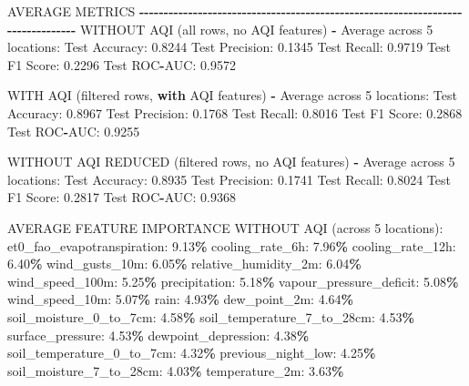 \documentclass[
  letterpaper,
  DIV=11,
  numbers=noendperiod]{scrartcl}
\newenvironment{Shaded}{\begin{snugshade}}{\end{snugshade}}
\newcommand{\BuiltInTok}[1]{#1}
\newcommand{\ControlFlowTok}[1]{\textcolor[rgb]{0.13,0.29,0.53}{\textbf{#1}}}
\newcommand{\DecValTok}[1]{\textcolor[rgb]{0.00,0.00,0.81}{#1}}
\newcommand{\FloatTok}[1]{\textcolor[rgb]{0.00,0.00,0.81}{#1}}
\newcommand{\NormalTok}[1]{#1}
\newcommand{\OperatorTok}[1]{\textcolor[rgb]{0.81,0.36,0.00}{\textbf{#1}}}
\begin{document}
\begin{Shaded}
\begin{Highlighting}[]
\NormalTok{AVERAGE METRICS}
\OperatorTok{{-}{-}{-}{-}{-}{-}{-}{-}{-}{-}{-}{-}{-}{-}{-}{-}{-}{-}{-}{-}{-}{-}{-}{-}{-}{-}{-}{-}{-}{-}{-}{-}{-}{-}{-}{-}{-}{-}{-}{-}{-}{-}{-}{-}{-}{-}{-}{-}{-}{-}{-}{-}{-}{-}{-}{-}{-}{-}{-}{-}{-}{-}{-}{-}{-}{-}{-}{-}{-}{-}{-}{-}{-}{-}{-}{-}{-}{-}{-}{-}}
\NormalTok{WITHOUT AQI (}\BuiltInTok{all}\NormalTok{ rows, no AQI features) }\OperatorTok{{-}}\NormalTok{ Average across }\DecValTok{5}\NormalTok{ locations:}
\NormalTok{  Test Accuracy: }\FloatTok{0.8244}
\NormalTok{  Test Precision: }\FloatTok{0.1345}
\NormalTok{  Test Recall: }\FloatTok{0.9719}
\NormalTok{  Test F1 Score: }\FloatTok{0.2296}
\NormalTok{  Test ROC}\OperatorTok{{-}}\NormalTok{AUC: }\FloatTok{0.9572}

\NormalTok{WITH AQI (filtered rows, }\ControlFlowTok{with}\NormalTok{ AQI features) }\OperatorTok{{-}}\NormalTok{ Average across }\DecValTok{5}\NormalTok{ locations:}
\NormalTok{  Test Accuracy: }\FloatTok{0.8967}
\NormalTok{  Test Precision: }\FloatTok{0.1768}
\NormalTok{  Test Recall: }\FloatTok{0.8016}
\NormalTok{  Test F1 Score: }\FloatTok{0.2868}
\NormalTok{  Test ROC}\OperatorTok{{-}}\NormalTok{AUC: }\FloatTok{0.9255}

\NormalTok{WITHOUT AQI REDUCED (filtered rows, no AQI features) }\OperatorTok{{-}}\NormalTok{ Average across }\DecValTok{5}\NormalTok{ locations:}
\NormalTok{  Test Accuracy: }\FloatTok{0.8935}
\NormalTok{  Test Precision: }\FloatTok{0.1741}
\NormalTok{  Test Recall: }\FloatTok{0.8024}
\NormalTok{  Test F1 Score: }\FloatTok{0.2817}
\NormalTok{  Test ROC}\OperatorTok{{-}}\NormalTok{AUC: }\FloatTok{0.9368}

\NormalTok{AVERAGE FEATURE IMPORTANCE WITHOUT AQI (across }\DecValTok{5}\NormalTok{ locations):}
\NormalTok{  et0\_fao\_evapotranspiration: }\FloatTok{9.13}\OperatorTok{\%}
\NormalTok{  cooling\_rate\_6h: }\FloatTok{7.96}\OperatorTok{\%}
\NormalTok{  cooling\_rate\_12h: }\FloatTok{6.40}\OperatorTok{\%}
\NormalTok{  wind\_gusts\_10m: }\FloatTok{6.05}\OperatorTok{\%}
\NormalTok{  relative\_humidity\_2m: }\FloatTok{6.04}\OperatorTok{\%}
\NormalTok{  wind\_speed\_100m: }\FloatTok{5.25}\OperatorTok{\%}
\NormalTok{  precipitation: }\FloatTok{5.18}\OperatorTok{\%}
\NormalTok{  vapour\_pressure\_deficit: }\FloatTok{5.08}\OperatorTok{\%}
\NormalTok{  wind\_speed\_10m: }\FloatTok{5.07}\OperatorTok{\%}
\NormalTok{  rain: }\FloatTok{4.93}\OperatorTok{\%}
\NormalTok{  dew\_point\_2m: }\FloatTok{4.64}\OperatorTok{\%}
\NormalTok{  soil\_moisture\_0\_to\_7cm: }\FloatTok{4.58}\OperatorTok{\%}
\NormalTok{  soil\_temperature\_7\_to\_28cm: }\FloatTok{4.53}\OperatorTok{\%}
\NormalTok{  surface\_pressure: }\FloatTok{4.53}\OperatorTok{\%}
\NormalTok{  dewpoint\_depression: }\FloatTok{4.38}\OperatorTok{\%}
\NormalTok{  soil\_temperature\_0\_to\_7cm: }\FloatTok{4.32}\OperatorTok{\%}
\NormalTok{  previous\_night\_low: }\FloatTok{4.25}\OperatorTok{\%}
\NormalTok{  soil\_moisture\_7\_to\_28cm: }\FloatTok{4.03}\OperatorTok{\%}
\NormalTok{  temperature\_2m: }\FloatTok{3.63}\OperatorTok{\%}


\end{Highlighting}
\end{Shaded}
\end{document}
